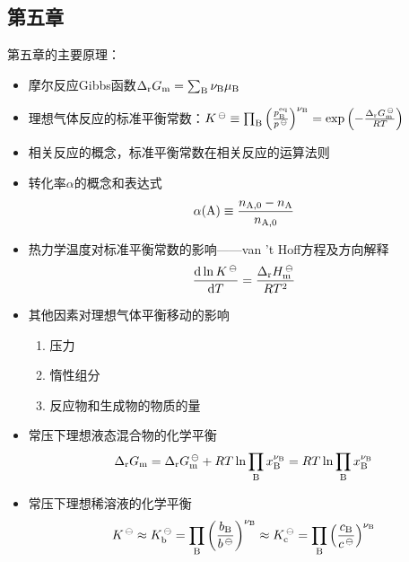 \documentclass[9pt]{beamer}
\newcommand\A{{\rm A}}
\newcommand\B{{\rm B}}
\newcommand*{\dif}{\mathop{}\!\mathrm{d}}
\newcommand\m{{\rm m}}
\newcommand\rr{{\rm r}}
\begin{document}
	\subsection{第五章}
	\begin{frame}
	
	第五章的主要原理：	
	\begin{itemize}
	
	\item 摩尔反应Gibbs函数$\Delta_\rr G_\m=\sum_\B \nu_\B \mu_\B$\
	
	\item 理想气体反应的标准平衡常数：$K^{\,\ominus} \equiv \prod_\B \left( \frac{ p^{\rm eq}_\B }{ p^{\,\ominus} } \right)^{\nu_\B} = \exp{ \left(-\frac{ \Delta_\rr G^{\,\ominus}_\m }{ RT }\right)} $
	
	\item 相关反应的概念，标准平衡常数在相关反应的运算法则
	
	\item 转化率$\alpha$的概念和表达式
	\[
		\alpha(\A) \equiv \frac{ n_{\A,0} - n_\A }{ n_{\A,0} }
	\]
	
	\item 热力学温度对标准平衡常数的影响——van 't Hoff方程及方向解释
	\[
		\frac{ \dif \ln{ K^{\,\ominus} } }{ \dif T } = \frac{ \Delta_\rr H^{\,\ominus}_\m }{ RT^2 }
	\]
	
	\item 其他因素对理想气体平衡移动的影响
		\begin{enumerate}
		
		\item 压力

		\item 惰性组分

		\item 反应物和生成物的物质的量	
	
		\end{enumerate}

	\end{itemize}
	
	\end{frame}
	
	\begin{frame}
	
	\begin{itemize}
	
	\item 常压下理想液态混合物的化学平衡
	\[
		\Delta_\rr G_\m = \Delta_\rr G^{\,\ominus}_\m + RT \ln{ \prod_\B x^{\nu_\B}_\B } = RT \ln{ \prod_\B x^{\nu_\B}_\B }
	\]
	
	\item 常压下理想稀溶液的化学平衡
	\[
		K^{\,\ominus} \approx K^{\,\ominus}_{\rm b} = \prod_\B \left( \frac{b_\B}{b^{\,\ominus}} \right)^{\nu_\B}  \approx K^{\,\ominus}_{\rm c} = \prod_\B \left( \frac{c_\B}{c^{\,\ominus}} \right)^{\nu_\B}
	\]
	
	\end{itemize}		
	
	\end{frame}
	
\end{document}
